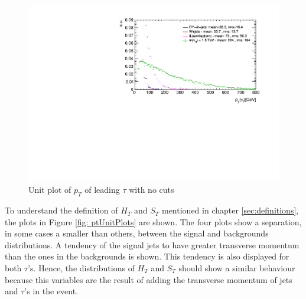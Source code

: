 \begin{figure}
\centering
\includegraphics[width=\linewidth]{Plots/tau1_pt_unitNC.pdf}
\caption{Unit plot of $p_{T}$ of leading $\tau$ with no cuts}
\label{fig: tau1ptunitNC}
\end{figure}

To understand the definition of $H_{T}$ and $S_{T}$ mentioned in chapter \ref{sec:definitions}, the plots in Figure \ref{fig: ptUnitPlots} are shown. The four plots show a separation, in some cases a smaller than others, between the signal and backgrounds distributions. A tendency of the signal jets to have greater transverse momentum than the ones in the backgrounds is shown. This tendency is also displayed for both $\tau$'s. Hence, the distributions of $H_{T}$ and $S_{T}$ should show a similar behaviour because this variables are the result of adding the transverse momentum of jets and $\tau$'s in the event.


